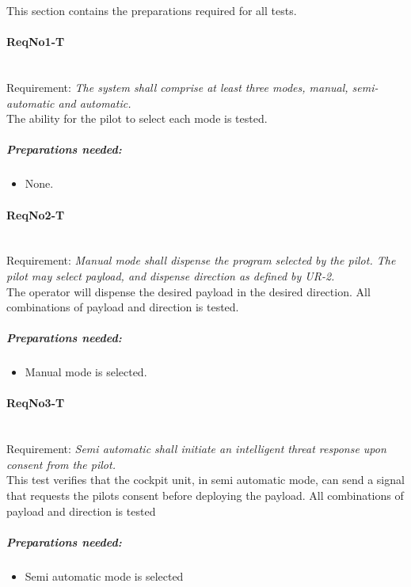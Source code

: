 \noindent
This section contains the preparations required for all tests.

\paragraph{ReqNo1-T}\mbox{}\\ %
Requirement: \textit{The system shall comprise at least three modes, manual, semi-automatic and automatic.}
\\
The ability for the pilot to select each mode is tested.

	\subparagraph{Preparations needed:}
	\begin{itemize}
	\item None.
	\end{itemize}


\paragraph{ReqNo2-T}\mbox{}\\ %
Requirement: \textit{Manual mode shall dispense the program selected by the pilot. The pilot may select payload, and dispense direction as defined by UR-2.}
\\
The operator will dispense the desired payload in the desired direction. All combinations of payload and direction is tested.
\\
	\subparagraph{Preparations needed:}
	\begin{itemize}
	\item Manual mode is selected.
	\end{itemize}


\paragraph{ReqNo3-T}\mbox{}\\ %
Requirement: \textit{Semi automatic shall initiate an intelligent threat response upon consent from the pilot.}
\\
This test verifies that the cockpit unit, in semi automatic mode, can send a signal that requests the pilots consent before deploying the payload. All combinations of payload and direction is tested
\\
	\subparagraph{Preparations needed:}
	\begin{itemize}
	\item Semi automatic mode is selected
	\end{itemize}



